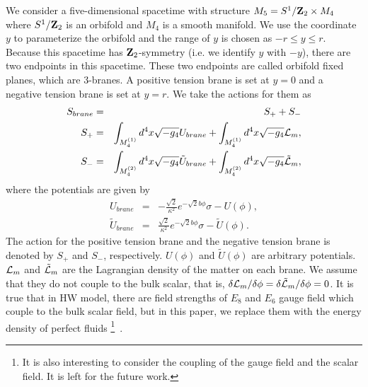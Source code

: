 \documentclass[a4paper,11pt]{article}
\begin{document}
We consider a five-dimensional spacetime with structure 
$M_5 = S^1/{\bf Z}_2 \times M_4$ where $S^1/{\bf Z}_2$ is an 
orbifold and $M_4$ is a smooth manifold. We use the coordinate $y$ to 
parameterize the orbifold and the range of $y$ is chosen as 
$-r \le y \le r$. Because this spacetime has ${\bf Z}_2$-symmetry (i.e. we  
identify $y$ with $-y$), there are two endpoints in this spacetime.  
These two endpoints are called orbifold fixed planes, 
which are 3-branes. A positive tension brane is set at $y=0$ 
and a negative tension brane is set at $y=r$. We take the actions for them as  
\begin{eqnarray}
S_{brane} &=& S_+ + S_- \nonumber \\
S_+ &=&  \int_{M_4^{(1)}} d^4 x 
                        \sqrt{-g_4} U_{brane} 
+\int_{M_4^{(1)}} d^4 x \sqrt{-g_4} {\cal L}_m, \\ \nonumber
S_- &=&  \int_{M_4^{(2)}} d^4 x
                        \sqrt{-g_4} \tilde{U}_{brane} 
+\int_{M_4^{(2)}} d^4 x \sqrt{-g_4} \tilde{{\cal L}}_m, 
\end{eqnarray}
where the potentials are given by
\begin{eqnarray}
U_{brane} &=& -\frac{\sqrt{2}}{\kappa^2} e^{-\sqrt{2} b \phi} \sigma
-U(\phi), \nonumber\\
\tilde{U}_{brane} &=& \frac{\sqrt{2}}{\kappa^2} e^{-\sqrt{2} b \phi} \sigma
-\tilde{U}(\phi). 
\end{eqnarray}
The action for the positive tension brane and the negative tension brane 
is denoted by $S_{+}$ and $S_{-}$, respectively.  
$U(\phi)$ and $\tilde{U}(\phi)$ are arbitrary potentials. 
${\cal L}_m$ and $\tilde{{\cal L}}_m$ 
are the Lagrangian density of the matter on each brane. 
We assume that they do not couple to the bulk scalar, that is, 
$\delta {\cal L}_m/\delta \phi 
= \delta {\tilde{\cal L}}_m/\delta \phi =0$.  
It is true that in HW model, there are  
field strengths of $E_8$ and $E_6$ gauge field which couple to 
the bulk scalar field, but in this paper, we replace them 
with the energy density of perfect fluids  
\footnote{
It is also interesting to consider the coupling of the gauge 
field and the scalar field. It is left for the 
future work. 
}\ . 
\end{document}
